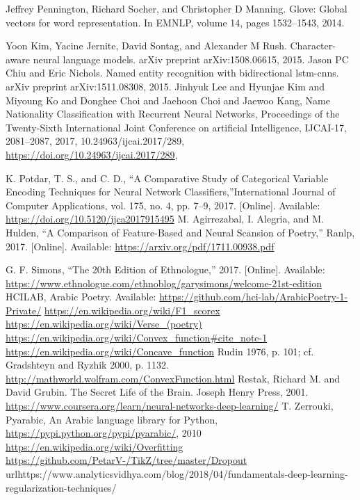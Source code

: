 \begin{thebibliography}{999}
 Jeffrey Pennington, Richard Socher, and Christopher D Manning. Glove: Global vectors for word representation. In EMNLP, volume 14, pages 1532–1543, 2014.

 Yoon Kim, Yacine Jernite, David Sontag, and Alexander M Rush. Character-aware neural language models. arXiv preprint arXiv:1508.06615, 2015.
 Jason PC Chiu and Eric Nichols. Named entity recognition with bidirectional lstm-cnns. arXiv preprint arXiv:1511.08308, 2015.
 Jinhyuk Lee and Hyunjae Kim and Miyoung Ko and Donghee Choi and Jaehoon Choi and Jaewoo Kang, Name Nationality Classification with Recurrent Neural Networks, Proceedings of the Twenty-Sixth International Joint Conference on artificial Intelligence, {IJCAI-17}, 2081--2087, 2017, 10.24963/ijcai.2017/289, \url{https://doi.org/10.24963/ijcai.2017/289},

K. Potdar, T. S., and C. D., “A Comparative Study of Categorical Variable Encoding Techniques for Neural Network Classifiers,”International Journal of Computer Applications, vol. 175, no. 4, pp. 7–9, 2017. [Online]. Available: \url{https://doi.org/10.5120/ijca2017915495}
 M. Agirrezabal, I. Alegria, and M. Hulden, “A Comparison of Feature-Based and Neural Scansion of Poetry,” Ranlp, 2017. [Online]. Available: \url{https://arxiv.org/pdf/1711.00938.pdf}

 G. F. Simons, “The 20th Edition of Ethnologue,” 2017. [Online]. Available: \url{https://www.ethnologue.com/ethnoblog/garysimons/welcome-21st-edition}
 HCILAB, Arabic Poetry. Available: \url{https://github.com/hci-lab/ArabicPoetry-1-Private/}
 \url{https://en.wikipedia.org/wiki/F1\_scorex}
 \url{https://en.wikipedia.org/wiki/Verse\_(poetry)}
 \url{https://en.wikipedia.org/wiki/Convex\_function\#cite\_note-1}
 \url{https://en.wikipedia.org/wiki/Concave\_function}
 Rudin 1976, p. 101; cf. Gradshteyn and Ryzhik 2000, p. 1132.
 \url{http://mathworld.wolfram.com/ConvexFunction.html}
 Restak, Richard M. and David Grubin. The Secret Life of the Brain. Joseph Henry Press, 2001.
 \url{https://www.coursera.org/learn/neural-networks-deep-learning/}
 T. Zerrouki‏, Pyarabic, An Arabic language library for Python, \url{https://pypi.python.org/pypi/pyarabic/}, 2010
 \url{https://en.wikipedia.org/wiki/Overfitting}
  \url{https://github.com/PetarV-/TikZ/tree/master/Dropout}
 url{https://www.analyticsvidhya.com/blog/2018/04/fundamentals-deep-learning-regularization-techniques/}
\end{thebibliography}


